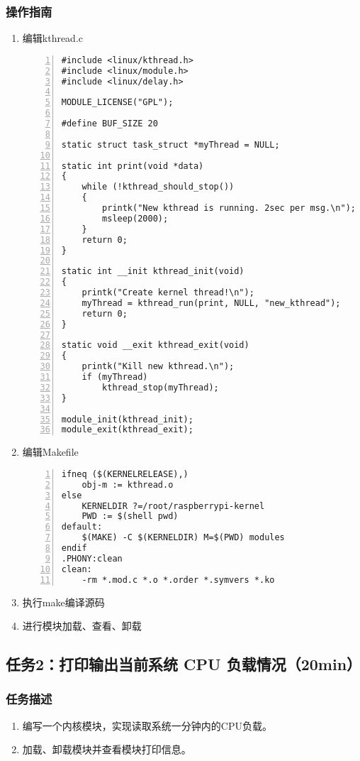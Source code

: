 \documentclass{article}
\begin{document}
\subsubsection{操作指南}
\begin{enumerate}
	\item 编辑kthread.c
	      \begin{lstlisting}[numbers=left]
#include <linux/kthread.h>
#include <linux/module.h>
#include <linux/delay.h>

MODULE_LICENSE("GPL");

#define BUF_SIZE 20

static struct task_struct *myThread = NULL;

static int print(void *data)
{
	while (!kthread_should_stop())
	{
		printk("New kthread is running. 2sec per msg.\n");
		msleep(2000);
	}
	return 0;
}

static int __init kthread_init(void)
{
	printk("Create kernel thread!\n");
	myThread = kthread_run(print, NULL, "new_kthread");
	return 0;
}

static void __exit kthread_exit(void)
{
	printk("Kill new kthread.\n");
	if (myThread)
		kthread_stop(myThread);
}

module_init(kthread_init);
module_exit(kthread_exit);

\end{lstlisting}
	\item 编辑Makefile
	      \begin{lstlisting}[numbers=left]
ifneq ($(KERNELRELEASE),)
	obj-m := kthread.o
else
	KERNELDIR ?=/root/raspberrypi-kernel
	PWD := $(shell pwd)
default:
	$(MAKE) -C $(KERNELDIR) M=$(PWD) modules
endif
.PHONY:clean
clean:
	-rm *.mod.c *.o *.order *.symvers *.ko
\end{lstlisting}
	\item 执行make编译源码
	\item 进行模块加载、查看、卸载
\end{enumerate}

\newpage

\subsection{任务2：打印输出当前系统 CPU 负载情况（20min）}

\subsubsection{任务描述}
\begin{enumerate}
	\item 编写一个内核模块，实现读取系统一分钟内的CPU负载。
	\item 加载、卸载模块并查看模块打印信息。
\end{enumerate}
\end{document}
